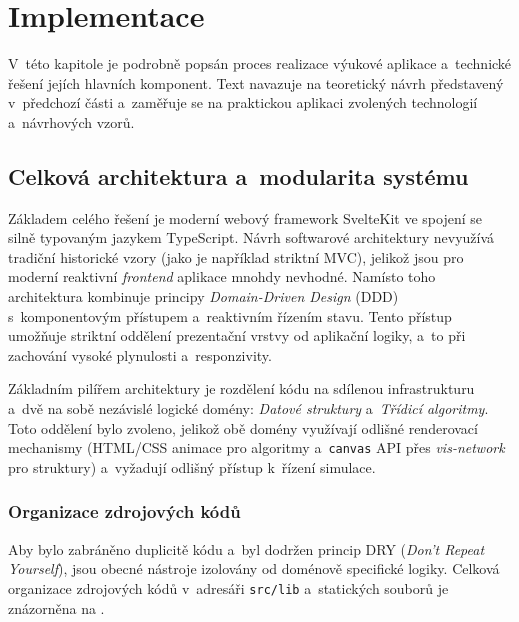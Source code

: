 \chapter{Implementace}
\label{chap:implementation}

V~této kapitole je podrobně popsán proces realizace výukové aplikace a~technické řešení jejích hlavních komponent.
Text navazuje na teoretický návrh představený v~předchozí části a~zaměřuje se na praktickou aplikaci zvolených technologií a~návrhových vzorů.

\section{Celková architektura a~modularita systému}
\label{sec:overall-architecture}

Základem celého řešení je moderní webový framework SvelteKit ve spojení se silně typovaným jazykem TypeScript.
Návrh softwarové architektury nevyužívá tradiční historické vzory (jako je například striktní MVC), jelikož jsou pro moderní reaktivní \textit{frontend} aplikace mnohdy nevhodné.
Namísto toho architektura kombinuje principy \textit{Domain-Driven Design} (DDD) s~komponentovým přístupem a~reaktivním řízením stavu.
Tento přístup umožňuje striktní oddělení prezentační vrstvy od aplikační logiky, a~to při zachování vysoké plynulosti a~responzivity.

Základním pilířem architektury je rozdělení kódu na sdílenou infrastrukturu a~dvě na sobě nezávislé logické domény: \textit{Datové struktury} a~\textit{Třídicí algoritmy}.
Toto oddělení bylo zvoleno, jelikož obě domény využívají odlišné renderovací mechanismy (HTML/CSS animace pro algoritmy a~\texttt{canvas} API přes \textit{vis-network} pro struktury) a~vyžadují odlišný přístup k~řízení simulace.

\subsection{Organizace zdrojových kódů}
\label{subsec:directory-structure}

Aby bylo zabráněno duplicitě kódu a~byl dodržen princip DRY (\textit{Don't Repeat Yourself}), jsou obecné nástroje izolovány od doménově specifické logiky.
Celková organizace zdrojových kódů v~adresáři \texttt{src/lib} a~statických souborů je znázorněna na .

\begin{listing}[ht]
    \inputminted{python3}{code/implementation/files}
    \caption{Struktura adresářů a~souborů implementace}
    \label{code:implementation-structure}
\end{listing}


